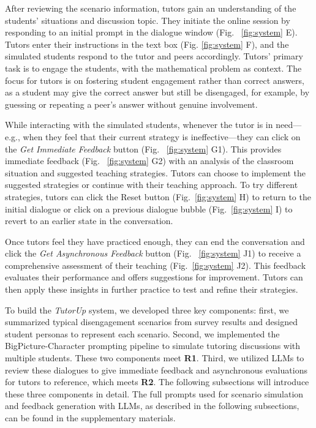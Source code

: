 After reviewing the scenario information, tutors gain an understanding of the students' situations and discussion topic. They initiate the online session by responding to an initial prompt in the dialogue window (Fig. ~\ref{fig:system} E). Tutors enter their instructions in the text box (Fig. \ref{fig:system} F), and the simulated students respond to the tutor and peers accordingly. Tutors' primary task is to engage the students, with the mathematical problem as context. The focus for tutors is on fostering student engagement rather than correct answers, as a student may give the correct answer but still be disengaged, for example, by guessing or repeating a peer’s answer without genuine involvement.

While interacting with the simulated students, whenever the tutor is in need—e.g., when they feel that their current strategy is ineffective—they can click on the \textit{Get Immediate Feedback} button (Fig. ~\ref{fig:system} G1). This provides immediate feedback (Fig. ~\ref{fig:system} G2) with an analysis of the classroom situation and suggested teaching strategies. Tutors can choose to implement the suggested strategies or continue with their teaching approach. To try different strategies, tutors can click the Reset button (Fig.~\ref{fig:system} H) to return to the initial dialogue or click on a previous dialogue bubble (Fig.~\ref{fig:system} I) to revert to an earlier state in the conversation.

Once tutors feel they have practiced enough, they can end the conversation and click the \textit{Get Asynchronous Feedback} button (Fig. ~\ref{fig:system} J1) to receive a comprehensive assessment of their teaching (Fig.~\ref{fig:system} J2). This feedback evaluates their performance and offers suggestions for improvement. Tutors can then apply these insights in further practice to test and refine their strategies.

To build the \textit{TutorUp} system, we developed three key components: first, we summarized typical disengagement scenarios from survey results and designed student personas to represent each scenario. Second, we implemented the BigPicture-Character prompting pipeline to simulate tutoring discussions with multiple students. These two components meet \textbf{R1}. Third, we utilized LLMs to review these dialogues to give immediate feedback and asynchronous evaluations for tutors to reference, which meets \textbf{R2}. The following subsections will introduce these three components in detail. The full prompts used for scenario simulation and feedback generation with LLMs, as described in the following subsections, can be found in the supplementary materials.


